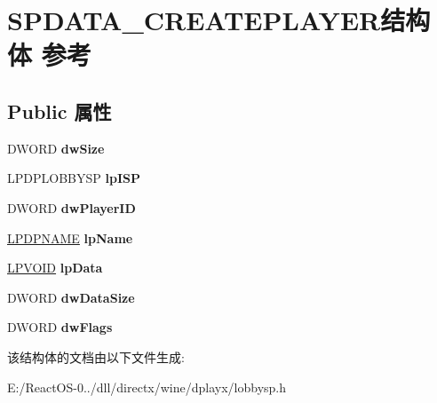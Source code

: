 \hypertarget{struct_s_p_d_a_t_a___c_r_e_a_t_e_p_l_a_y_e_r}{}\section{S\+P\+D\+A\+T\+A\+\_\+\+C\+R\+E\+A\+T\+E\+P\+L\+A\+Y\+E\+R结构体 参考}
\label{struct_s_p_d_a_t_a___c_r_e_a_t_e_p_l_a_y_e_r}
\subsection*{Public 属性}
\begin{DoxyCompactItemize}
\item 
\mbox{\label{struct_s_p_d_a_t_a___c_r_e_a_t_e_p_l_a_y_e_r_a626e8f03e3830060272f66ed60f98175}} 
D\+W\+O\+RD {\bfseries dw\+Size}
\item 
\mbox{\label{struct_s_p_d_a_t_a___c_r_e_a_t_e_p_l_a_y_e_r_a6a63922cc8e53fc8d07ba6710b9a777e}} 
L\+P\+D\+P\+L\+O\+B\+B\+Y\+SP {\bfseries lp\+I\+SP}
\item 
\mbox{\label{struct_s_p_d_a_t_a___c_r_e_a_t_e_p_l_a_y_e_r_a627642c1b4536a5c9bf73427681e2481}} 
D\+W\+O\+RD {\bfseries dw\+Player\+ID}
\item 
\mbox{\label{struct_s_p_d_a_t_a___c_r_e_a_t_e_p_l_a_y_e_r_adb49371da480f4dae543297e49d2981e}} 
\hyperlink{structtag_d_p_n_a_m_e}{L\+P\+D\+P\+N\+A\+ME} {\bfseries lp\+Name}
\item 
\mbox{\label{struct_s_p_d_a_t_a___c_r_e_a_t_e_p_l_a_y_e_r_a5f81c785f725b2fd17e90118f8c90df8}} 
\hyperlink{interfacevoid}{L\+P\+V\+O\+ID} {\bfseries lp\+Data}
\item 
\mbox{\label{struct_s_p_d_a_t_a___c_r_e_a_t_e_p_l_a_y_e_r_a7954bbdca077f043c1130098418dffa0}} 
D\+W\+O\+RD {\bfseries dw\+Data\+Size}
\item 
\mbox{\label{struct_s_p_d_a_t_a___c_r_e_a_t_e_p_l_a_y_e_r_a0188b0fda36697d0c34f30d0a2e6b48c}} 
D\+W\+O\+RD {\bfseries dw\+Flags}
\end{DoxyCompactItemize}


该结构体的文档由以下文件生成\+:\begin{DoxyCompactItemize}
\item 
E\+:/\+React\+O\+S-\/0../dll/directx/wine/dplayx/lobbysp.\+h\end{DoxyCompactItemize}
